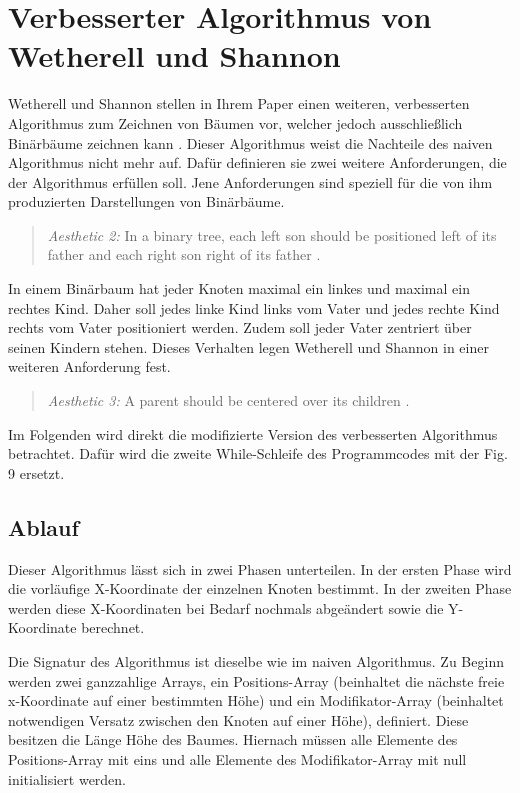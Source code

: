 \section{Verbesserter Algorithmus von Wetherell und Shannon}
\label{chap:kapitel3_2}
Wetherell und Shannon stellen in Ihrem Paper einen weiteren, verbesserten Algorithmus zum Zeichnen von Bäumen vor, welcher jedoch
ausschließlich Binärbäume zeichnen kann \cite{q1}. Dieser Algorithmus weist die Nachteile des naiven Algorithmus nicht mehr auf.
Dafür definieren sie zwei weitere Anforderungen, die der Algorithmus erfüllen soll. Jene Anforderungen sind speziell für
die von ihm produzierten Darstellungen von Binärbäume.   

\begin{quotation}
	\textit{Aesthetic 2:} In a binary tree, each left son should be positioned
	left of its father and each right son right of its father \cite[S. 517]{q1}.
\end{quotation}

In einem Binärbaum hat jeder Knoten maximal ein linkes und maximal ein rechtes Kind. Daher soll jedes linke Kind 
links vom Vater und jedes rechte Kind rechts vom Vater positioniert werden. Zudem soll jeder Vater zentriert über seinen Kindern
stehen. Dieses Verhalten legen Wetherell und Shannon in einer weiteren Anforderung fest.

\begin{quotation}
	\textit{Aesthetic 3:} A parent should be centered over its children \cite[S. 518]{q1}.
\end{quotation}

Im Folgenden wird direkt die modifizierte Version des verbesserten Algorithmus betrachtet. Dafür wird die zweite While-Schleife des Programmcodes
mit der Fig. 9 \cite[A modification of Algorithm 3, S. 519]{q1} ersetzt.

\label{chap:kapitel3_2_Ablauf}
\subsection{Ablauf}

Dieser Algorithmus lässt sich in zwei Phasen unterteilen. In der ersten Phase wird die vorläufige X-Koordinate der einzelnen Knoten bestimmt.
In der zweiten Phase werden diese X-Koordinaten bei Bedarf nochmals abgeändert sowie die Y-Koordinate berechnet.

Die Signatur des Algorithmus ist dieselbe wie im naiven Algorithmus. Zu Beginn werden zwei
ganzzahlige Arrays, ein Positions-Array (beinhaltet die nächste freie x-Koordinate auf einer bestimmten Höhe) und ein 
Modifikator-Array (beinhaltet notwendigen Versatz zwischen den Knoten auf einer Höhe), definiert. Diese besitzen die Länge 
\glqq Höhe des Baumes\grqq{}.
Hiernach müssen alle Elemente des Positions-Array mit eins und alle Elemente des Modifikator-Array mit null initialisiert werden.

